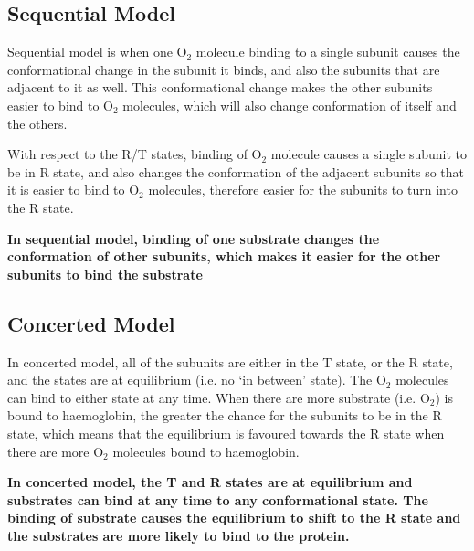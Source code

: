 \subsection{Sequential Model}

Sequential model is when one O$_2$ molecule binding to a single subunit causes the conformational change in the subunit it binds, and also the subunits that are adjacent to it as well.
This conformational change makes the other subunits easier to bind to O$_2$ molecules, which will also change conformation of itself and the others.

With respect to the R/T states, binding of O$_2$ molecule causes a single subunit to be in R state, and also changes the conformation of the adjacent subunits so that it is easier to bind to O$_2$ molecules, therefore easier for the subunits to turn into the R state.

\textbf{In sequential model, binding of one substrate changes the conformation of other subunits, which makes it easier for the other subunits to bind the substrate}

\subsection{Concerted Model}

In concerted model, all of the subunits are either in the T state, or the R state, and the states are at equilibrium (i.e. no `in between' state).
The O$_2$ molecules can bind to either state at any time.
When there are more substrate (i.e. O$_2$) is bound to haemoglobin, the greater the chance for the subunits to be in the R state, which means that the equilibrium is favoured towards the R state when there are more O$_2$ molecules bound to haemoglobin.

\textbf{ In concerted model, the T and R states are at equilibrium and substrates can bind at any time to any conformational state. The binding of substrate causes the equilibrium to shift to the R state and the substrates are more likely to bind to the protein.}


